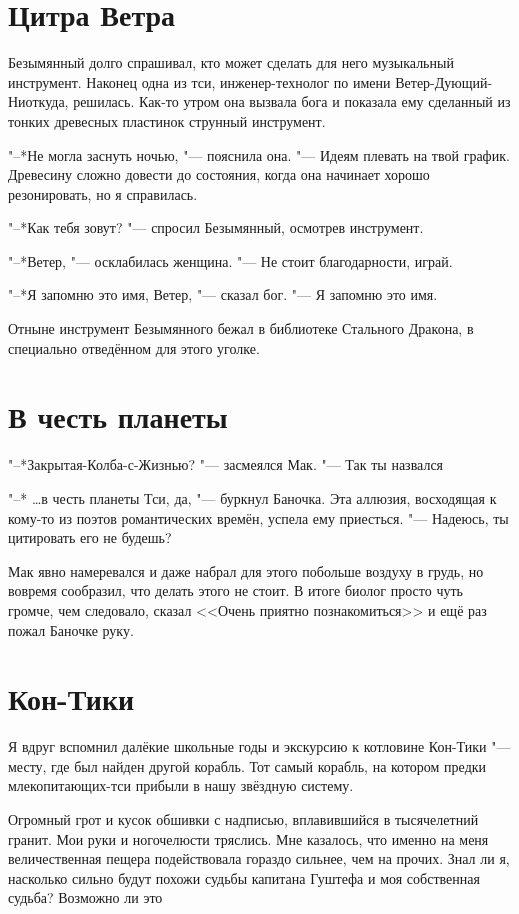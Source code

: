 \documentclass[a4paper,10pt]{book}
\newcommand{\ldotst}{\so{...}\xspace}
\newcommand{\ldotsq}{\so{?\hbox{\hspace{-.212em}}..}\xspace}
\begin{document}
 \section{Цитра Ветра}

 Безымянный долго спрашивал, кто может сделать для него музыкальный инструмент. 
Наконец одна из тси, инженер-технолог по имени Ветер-Дующий-Ниоткуда, решилась.
Как-то утром она вызвала бога и показала ему сделанный из тонких древесных 
пластинок струнный инструмент.

"--*Не могла заснуть ночью, "--- пояснила она. "--- Идеям плевать на твой 
график. Древесину сложно довести до состояния, когда она начинает хорошо 
резонировать, но я справилась.

"--*Как тебя зовут? "--- спросил Безымянный, осмотрев инструмент.

"--*Ветер, "--- осклабилась женщина. "--- Не стоит благодарности, играй.

"--*Я запомню это имя, Ветер, "--- сказал бог. "--- Я запомню это имя.

Отныне инструмент Безымянного бежал в библиотеке Стального Дракона, в 
специально отведённом для этого уголке.
 
\section{В честь планеты}
 
"--*Закрытая-Колба-с-Жизнью? "--- засмеялся Мак. "--- Так ты назвался\ldotst

"--* \dots в честь планеты Тси, да, "--- буркнул Баночка. Эта аллюзия, 
восходящая
к кому-то из поэтов романтических времён, успела ему приесться. "--- Надеюсь, 
ты 
цитировать его не будешь?

Мак явно намеревался и даже набрал для этого побольше воздуху в грудь, но 
вовремя сообразил,
что делать этого не стоит. В итоге биолог просто чуть громче, чем следовало, 
сказал <<Очень приятно познакомиться>>
и ещё раз пожал Баночке руку.
 
\section{Кон-Тики}

 Я вдруг вспомнил далёкие школьные годы и экскурсию к котловине Кон-Тики "---
месту, где был найден другой корабль. Тот самый корабль, на котором предки 
млекопитающих-тси прибыли в нашу звёздную систему.

Огромный грот и кусок обшивки с надписью, вплавившийся в тысячелетний гранит. 
Мои руки и ногочелюсти тряслись. Мне казалось, что именно на меня 
величественная пещера подействовала гораздо сильнее, чем на прочих.
Знал ли я, насколько сильно будут похожи судьбы капитана Гуштефа и моя 
собственная судьба? Возможно ли это\ldotsq
\end{document}
